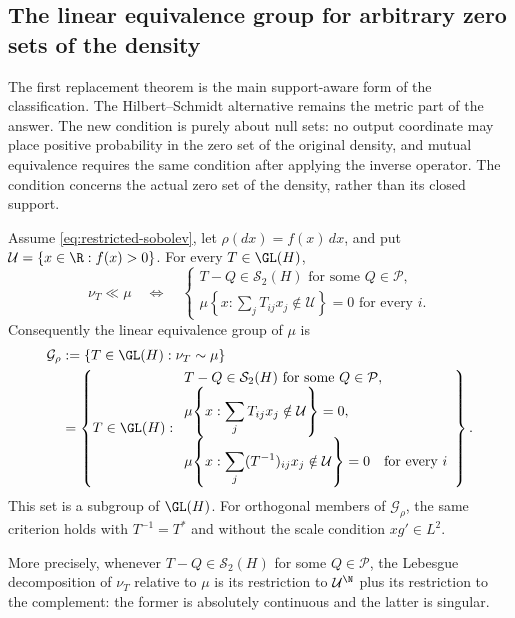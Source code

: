 \subsection{The linear equivalence group for arbitrary zero sets of the density}
\label{sec:linear-equivalence-group}

The first replacement theorem is the main support-aware form of the
classification.
The Hilbert--Schmidt alternative remains the metric part of the answer.
The new condition is purely about null sets: no output coordinate may place
positive probability in the zero set of the original density, and mutual
equivalence requires the same condition after applying the inverse operator.
The condition concerns the actual zero set of the density, rather than its
closed support.

\begin{theorem}
\label{thm:linear-equivalence-group}
Assume \eqref{eq:restricted-sobolev}, let $\rho(dx)=f(x)\,dx$, and put
$\mathcal U=\{x\in\R:f(x)>0\}$.  For every $T\in\GL(H)$,
\begin{equation}
 \nu_T\ll\mu
 \quad\Longleftrightarrow\quad
 \begin{cases}
 T-Q\in\mathcal S_2(H)\text{ for some }Q\in\mathcal P,\\
 \displaystyle
 \mu\!\left\{x:\sum_jT_{ij}x_j\notin\mathcal U\right\}=0
       \text{ for every }i.
 \end{cases}
 \label{eq:absolute-continuity-operator-criterion}
\end{equation}
Consequently the linear equivalence group of $\mu$ is
\begin{equation}
 \begin{aligned}
 \mathcal G_\rho
 &:=\{T\in\GL(H):\nu_T\sim\mu\}\\
 &=\left\{T\in\GL(H):
 \begin{array}{l}
 T-Q\in\mathcal S_2(H)\text{ for some }Q\in\mathcal P,\\
 \displaystyle\mu\!\left\{x:\sum_jT_{ij}x_j\notin\mathcal U\right\}=0,\\
 \displaystyle\mu\!\left\{x:\sum_j(T^{-1})_{ij}x_j\notin\mathcal U\right\}=0
       \quad\text{for every }i
 \end{array}\right\}.
 \end{aligned}
 \label{eq:linear-equivalence-group}
\end{equation}
This set is a subgroup of $\GL(H)$.  For orthogonal members of
$\mathcal G_\rho$, the same criterion holds with $T^{-1}=T^*$
and without the scale condition $xg'\in L^2$.

More precisely, whenever $T-Q\in\mathcal S_2(H)$ for some
$Q\in\mathcal P$, the Lebesgue decomposition of $\nu_T$ relative to
$\mu$ is its restriction to $\mathcal U^{\N}$ plus its restriction
to the complement: the former is absolutely continuous and the latter
is singular.
\end{theorem}
